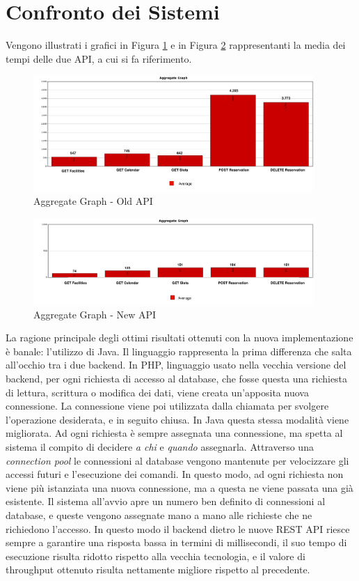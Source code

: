 \section{Confronto dei Sistemi}
Vengono illustrati i grafici in Figura \ref{fig:oldapi100t_aggregate} e in Figura \ref{fig:newapi100t_aggregate} rappresentanti la media dei tempi delle due API, a cui si fa riferimento.
\begin{figure}[H]
    \centering
    \includegraphics[width=0.95\textwidth]{images/04_3_old_api_aggregate_graph_legend.pdf}
    \caption{Aggregate Graph - Old API}
    \label{fig:oldapi100t_aggregate}
\end{figure}
\begin{figure}[H]
    \centering
    \includegraphics[width=0.95\textwidth]{images/04_4_new_api_aggregate_graph_legend.pdf}
    \caption{Aggregate Graph - New API}
    \label{fig:newapi100t_aggregate}
\end{figure}
La ragione principale degli ottimi risultati ottenuti con la nuova implementazione è banale: l'utilizzo di Java. Il linguaggio rappresenta la prima differenza che salta all'occhio tra i due backend. In PHP, linguaggio usato nella vecchia versione del backend, per ogni richiesta di accesso al database, che fosse questa una richiesta di lettura, scrittura o modifica dei dati, viene creata un'apposita nuova connessione. La connessione viene poi utilizzata dalla chiamata per svolgere l'operazione desiderata, e in seguito chiusa. In Java questa stessa modalità viene migliorata. Ad ogni richiesta è sempre assegnata una connessione, ma spetta al sistema il compito di decidere \emph{a chi} e \emph{quando} assegnarla. Attraverso una \emph{connection pool} le connessioni al database vengono mantenute per velocizzare gli accessi futuri e l'esecuzione dei comandi. In questo modo, ad ogni richiesta non viene più istanziata una nuova connessione, ma a questa ne viene passata una già esistente. Il sistema all'avvio apre un numero ben definito di connessioni al database, e queste vengono assegnate mano a mano alle richieste che ne richiedono l'accesso. In questo modo il backend dietro le nuove REST API riesce sempre a garantire una risposta bassa in termini di millisecondi, il suo tempo di esecuzione risulta ridotto rispetto alla vecchia tecnologia, e il valore di throughput ottenuto risulta nettamente migliore rispetto al precedente.